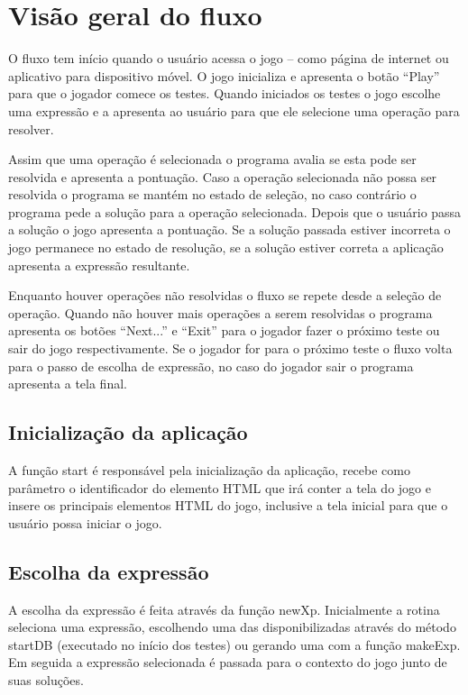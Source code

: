 \chapter{Visão geral do fluxo}
O fluxo tem início quando o usuário acessa o jogo – como página de internet ou aplicativo para dispositivo móvel. O jogo inicializa e apresenta o botão “Play” para que o jogador comece os testes. Quando iniciados os testes o jogo escolhe uma expressão e a apresenta ao usuário para que ele selecione uma operação para resolver.

Assim que uma operação é selecionada o programa avalia se esta pode ser resolvida e apresenta a pontuação. Caso a operação selecionada não possa ser resolvida o programa se mantém no estado de seleção, no caso contrário o programa pede a solução para a operação selecionada. Depois que o usuário passa a solução o jogo apresenta a pontuação. Se a solução passada estiver incorreta o jogo permanece no estado de resolução, se a solução estiver correta a aplicação apresenta a expressão resultante.

Enquanto houver operações não resolvidas o fluxo se repete desde a seleção de operação. Quando não houver mais operações a serem resolvidas o programa apresenta os botões “Next...” e “Exit” para o jogador fazer o próximo teste ou sair do jogo respectivamente. Se o jogador for para o próximo teste o fluxo volta para o passo de escolha de expressão, no caso do jogador sair o programa apresenta a tela final.

\section{Inicialização da aplicação}
A função start é responsável pela inicialização da aplicação, recebe como parâmetro o identificador do elemento HTML que irá conter a tela do jogo e insere os principais elementos HTML do jogo, inclusive a tela inicial para que o usuário possa iniciar o jogo.

\section{Escolha da expressão}
A escolha da expressão é feita através da função newXp. Inicialmente a rotina seleciona uma expressão, escolhendo uma das disponibilizadas através do método startDB (executado no início dos testes) ou gerando uma com a função makeExp. Em seguida a expressão selecionada é passada para o contexto do jogo junto de suas soluções.

